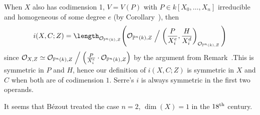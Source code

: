 \documentclass[a4paper,parskip=half,numbers=enddot, DIV=12, headheight=30pt]{scrreprt}
\begin{document}
\begin{rem*}
    When $X$ also has codimension 1, $V=V(P)$ with $P\in k[X_0,\ldots,X_n]$ irreducible and homogeneous of some degree $e$ (by Corollary~), then 
    \begin{align*}
        i(X,C;Z) = \length_{\Oo_{\IP^n(k), Z}}\Bigg(\Oo_{\IP^n(k), Z} \Bigm/ \left( \frac{P}{X_i^e}, \frac{H}{X_i^d}\right)_{\Oo_{\IP^n(k), Z}}\Bigg)
    \end{align*}
    since $\mathcal{O}_{X,Z}\simeq \mathcal{O}_{\mathbb{P}^n(k),Z}\Bigm/\left(\frac{P}{X_i^e}\cdot\mathcal{O}_{\mathbb{P}^n(k),Z}\right)$ by the argument from Remark~.This is symmetric in $P$ and $H$, hence our definition of $i(X,C;Z)$ is symmetric in $X$ and $C$ when both are of codimension $1$. Serre's $i$ is always symmetric in the first two operands.
    
    It seems that B\'ezout treated the case $n=2$, $\dim(X) = 1$ in the $18^{\text{th}}$ century.
\end{rem*}
\end{document}
